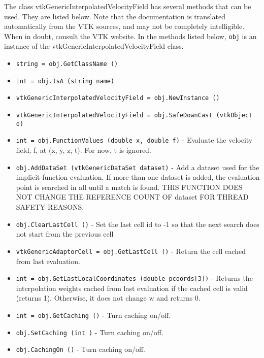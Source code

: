 The class vtkGenericInterpolatedVelocityField has several methods that can be used.
  They are listed below.
Note that the documentation is translated automatically from the VTK sources,
and may not be completely intelligible.  When in doubt, consult the VTK website.
In the methods listed below, \verb|obj| is an instance of the vtkGenericInterpolatedVelocityField class.
\begin{itemize}
\item  \verb|string = obj.GetClassName ()|

\item  \verb|int = obj.IsA (string name)|

\item  \verb|vtkGenericInterpolatedVelocityField = obj.NewInstance ()|

\item  \verb|vtkGenericInterpolatedVelocityField = obj.SafeDownCast (vtkObject o)|

\item  \verb|int = obj.FunctionValues (double x, double f)| -  Evaluate the velocity field, f, at (x, y, z, t).
 For now, t is ignored.

\item  \verb|obj.AddDataSet (vtkGenericDataSet dataset)| -  Add a dataset used for the implicit function evaluation.
 If more than one dataset is added, the evaluation point is
 searched in all until a match is found. THIS FUNCTION
 DOES NOT CHANGE THE REFERENCE COUNT OF dataset FOR THREAD
 SAFETY REASONS.

\item  \verb|obj.ClearLastCell ()| -  Set the last cell id to -1 so that the next search does not
 start from the previous cell

\item  \verb|vtkGenericAdaptorCell = obj.GetLastCell ()| -  Return the cell cached from last evaluation.

\item  \verb|int = obj.GetLastLocalCoordinates (double pcoords[3])| -  Returns the interpolation weights cached from last evaluation
 if the cached cell is valid (returns 1). Otherwise, it does not
 change w and returns 0.

\item  \verb|int = obj.GetCaching ()| -  Turn caching on/off.

\item  \verb|obj.SetCaching (int )| -  Turn caching on/off.

\item  \verb|obj.CachingOn ()| -  Turn caching on/off.


\end{itemize}

